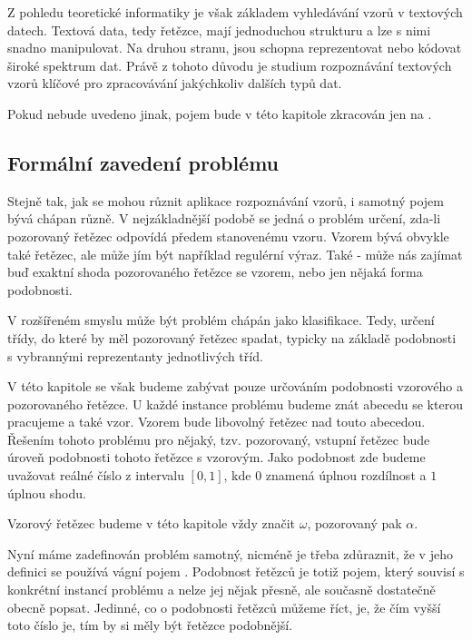 \documentclass[a4paper,10pt]{article}
\begin{document}
Z pohledu teoretické informatiky je však základem vyhledávání vzorů v textových datech. Textová data, tedy řetězce, mají jednoduchou strukturu a lze s nimi snadno manipulovat. Na druhou stranu, jsou schopna reprezentovat nebo kódovat široké spektrum dat. Právě z tohoto důvodu je studium rozpoznávání textových vzorů klíčové pro zpracovávání jakýchkoliv dalších typů dat.

\begin{note}
 Pokud nebude uvedeno jinak, pojem  bude v této kapitole zkracován jen na .
\end{note}

\subsection{Formální zavedení problému}
Stejně tak, jak se mohou různit aplikace rozpoznávání vzorů, i samotný pojem  bývá chápan různě. V nejzákladnější podobě se jedná o problém určení, zda-li pozorovaný řetězec odpovídá předem stanovenému vzoru. Vzorem bývá obvykle také řetězec, ale může jím být například regulérní výraz. Také - může nás zajímat buď exaktní shoda pozorovaného řetězce se vzorem, nebo jen nějaká forma podobnosti. 

V rozšířeném smyslu může být problém chápán jako klasifikace. Tedy, určení třídy, do které by měl pozorovaný řetězec spadat, typicky na základě podobnosti s vybrannými reprezentanty jednotlivých tříd. 

V této kapitole se však budeme zabývat pouze určováním podobnosti vzorového a pozorovaného řetězce. U každé instance problému budeme znát abecedu se kterou pracujeme a také vzor. Vzorem bude libovolný řetězec nad touto abecedou. Řešením tohoto problému pro nějaký, tzv. pozorovaný, vstupní řetězec bude úroveň podobnosti tohoto řetězce s vzorovým. Jako podobnost zde budeme uvažovat reálné číslo z intervalu $[0, 1]$, kde $0$ znamená úplnou rozdílnost a $1$ úplnou shodu. 

\begin{note}
 Vzorový řetězec budeme v této kapitole vždy značit $\omega$, pozorovaný pak $\alpha$.
\end{note}

Nyní máme zadefinován problém samotný, nicméně je třeba zdůraznit, že v jeho definici se používá vágní pojem . Podobnost řetězců je totiž pojem, který souvisí s konkrétní instancí problému a nelze jej nějak přesně, ale současně dostatečně obecně popsat. Jedinné, co o podobnosti řetězců můžeme říct, je, že čím vyšší toto číslo je, tím by si měly být řetězce podobnější.
\end{document}
